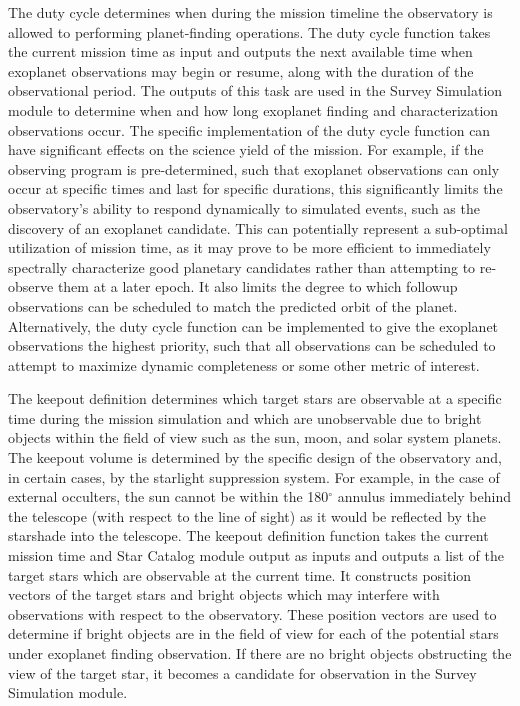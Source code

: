 \documentclass[]{asme2ej}
\begin{document}
The duty cycle determines when during the mission timeline the observatory is allowed to performing planet-finding operations. The duty cycle function takes the current mission time as input and outputs the next available time when exoplanet observations may begin or resume, along with the duration of the observational period. The outputs of this task are used in the Survey Simulation module to determine when and how long exoplanet finding and characterization observations occur.  The specific implementation of the duty cycle function can have significant effects on the science yield of the mission.  For example, if the observing program is pre-determined, such that exoplanet observations can only occur at specific times and last for specific durations, this significantly limits the observatory's ability to respond dynamically to simulated events, such as the discovery of an exoplanet candidate.  This can potentially represent a sub-optimal utilization of mission time, as it may prove to be more efficient to immediately spectrally characterize good planetary candidates rather than attempting to re-observe them at a later epoch.  It also limits the degree to which followup observations can be scheduled to match the predicted orbit of the planet.  Alternatively, the duty cycle function can be implemented to give the exoplanet observations the highest priority, such that all observations can be scheduled to attempt to maximize dynamic completeness \citep{brown2010new} or some other metric of interest. 

The keepout definition determines which target stars are observable at a specific time during the mission simulation and which are unobservable due to bright objects within the field of view such as the sun, moon, and solar system planets.  The keepout volume is determined by the specific design of the observatory and, in certain cases, by the starlight suppression system.  For example, in the case of external occulters, the sun cannot be within the 180$^\circ$ annulus immediately behind the telescope (with respect to the line of sight) as it would be reflected by the starshade into the telescope.  The  keepout definition function takes the current mission time and Star Catalog module output as inputs and outputs a list of the target stars which are observable at the current time. It constructs position vectors of the target stars and bright objects which may interfere with observations with respect to the observatory. These position vectors are used to determine if bright objects are in the field of view for each of the potential stars under exoplanet finding observation. If there are no bright objects obstructing the view of the target star, it becomes a candidate for observation in the Survey Simulation module.
\end{document}
